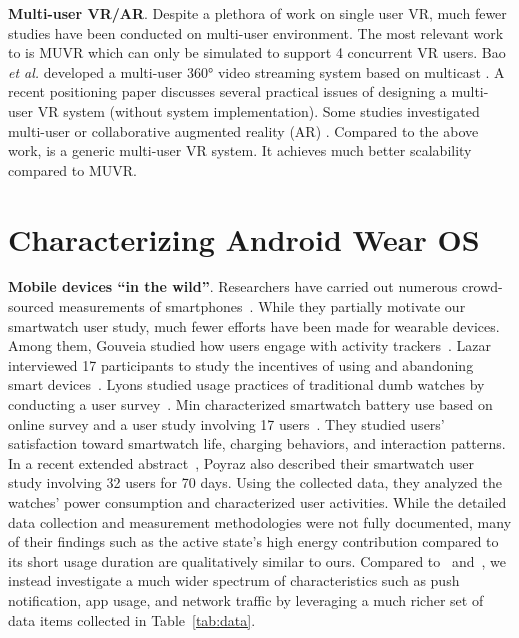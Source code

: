 \textbf{Multi-user VR/AR}. Despite a plethora of work on single user
VR, much fewer studies have been conducted on
multi-user environment. The most relevant work to \firefly is
MUVR \cite{li2018muvr} which can only be simulated to support 4 concurrent VR users.
Bao \emph{et al.} developed
a multi-user 360° video streaming system based on
multicast \cite{bao2017motion}. A recent positioning paper \cite{liu2019supporting} discusses several
practical issues of designing a multi-user VR system
(without system implementation). Some studies investigated
multi-user or collaborative augmented reality (AR) \cite{qiu2018avr,ran2019sharear,zhang2018cars}.
Compared to the above work, \firefly is a generic multi-user
VR system. It achieves much better scalability compared to
MUVR.


\section{Characterizing Android Wear OS}

\textbf{Mobile devices ``in the wild''}. Researchers have carried out numerous
crowd-sourced measurements of smartphones~\cite{huang10,falaki10_mobisys,shepard10,phonelab,qian12_mobisys,rosen15_imc,nikravesh15_mobisys,chen15:sigmetrics}. While they partially motivate our smartwatch user study, much fewer efforts have been made for wearable devices.
Among them,
Gouveia \etal studied how users engage with activity trackers~\cite{gouveia15_ubicomp}.
%
Lazar \etal interviewed 17 participants to study the incentives of using and abandoning smart devices~\cite{lazar15_ubicomp}.
%
Lyons studied usage practices of traditional dumb watches by conducting a user survey~\cite{lyons15_iswc}.
%
Min \etal characterized smartwatch battery use based on online survey and a user study involving 17 users~\cite{min15_iswc}. They studied users' satisfaction toward smartwatch life, charging behaviors,
and interaction patterns.
%
In a recent extended abstract~\cite{poyraz_iiswc16}, Poyraz \etal also described their smartwatch user study involving 32 users for 70 days. Using the collected data, they analyzed the watches' power consumption and characterized user activities. While the detailed data collection and measurement methodologies were not fully documented, many of their findings such as the active state's high energy contribution compared to its short usage duration are qualitatively similar to ours.
%
Compared to~\cite{min15_iswc} and~\cite{poyraz_iiswc16}, we instead investigate a much wider spectrum of characteristics such as push notification, app usage, and network traffic by leveraging a much richer set of data items collected in Table~\ref{tab:data}.

